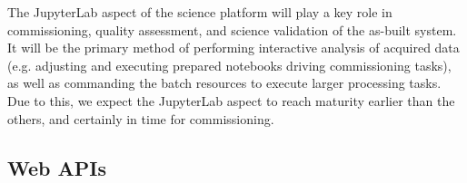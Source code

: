 \documentclass[DM,lsstdraft,toc]{lsstdoc}
\begin{document}

The JupyterLab aspect of the science platform will play a key role in commissioning,
quality assessment, and science validation of the as-built system. It will be the primary
method of performing interactive analysis of acquired data (e.g. adjusting and executing
prepared notebooks driving commissioning tasks), as well as commanding
the batch resources to execute larger processing tasks. Due to this, we expect the
JupyterLab aspect to reach maturity earlier than the others, and certainly in time for
commissioning.


\subsection{Web APIs\label{sec:apis}}
\end{document}
